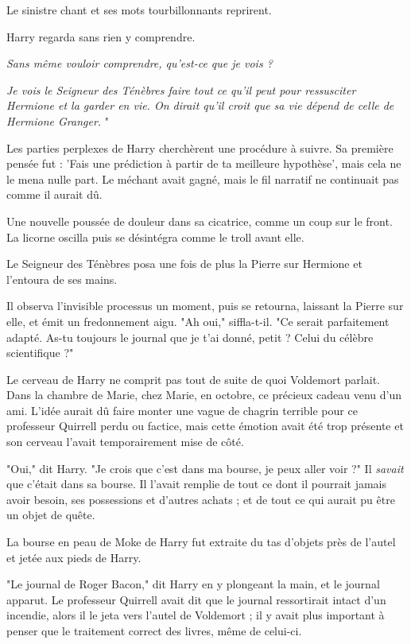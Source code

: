 Le sinistre chant et ses mots tourbillonnants reprirent.

Harry regarda sans rien y comprendre.

\emph{Sans même vouloir comprendre, qu'est-ce que je vois ?} 

\emph{Je vois le Seigneur des Ténèbres faire tout ce qu'il peut pour ressusciter Hermione et la garder en vie. On dirait qu'il croit que sa vie dépend de celle de Hermione Granger.} "

Les parties perplexes de Harry cherchèrent une procédure à suivre. Sa première pensée fut : 'Fais une prédiction à partir de ta meilleure hypothèse', mais cela ne le mena nulle part. Le méchant avait gagné, mais le fil narratif ne continuait pas comme il aurait dû.

Une nouvelle poussée de douleur dans sa cicatrice, comme un coup sur le front. La licorne oscilla puis se désintégra comme le troll avant elle.

Le Seigneur des Ténèbres posa une fois de plus la Pierre sur Hermione et l'entoura de ses mains.

Il observa l'invisible processus un moment, puis se retourna, laissant la Pierre sur elle, et émit un fredonnement aigu. "Ah oui," siffla-t-il. "Ce serait parfaitement adapté. As-tu toujours le journal que je t'ai donné, petit ? Celui du célèbre scientifique ?"

Le cerveau de Harry ne comprit pas tout de suite de quoi Voldemort parlait. Dans la chambre de Marie, chez Marie, en octobre, ce précieux cadeau venu d'un ami. L'idée aurait dû faire monter une vague de chagrin terrible pour ce professeur Quirrell perdu ou factice, mais cette émotion avait été trop présente et son cerveau l'avait temporairement mise de côté.

"Oui," dit Harry. "Je crois que c'est dans ma bourse, je peux aller voir ?" Il \emph{savait}  que c'était dans sa bourse. Il l'avait remplie de tout ce dont il pourrait jamais avoir besoin, ses possessions et d'autres achats ; et de tout ce qui aurait pu être un objet de quête.

La bourse en peau de Moke de Harry fut extraite du tas d'objets près de l'autel et jetée aux pieds de Harry.

"Le journal de Roger Bacon," dit Harry en y plongeant la main, et le journal apparut. Le professeur Quirrell avait dit que le journal ressortirait intact d'un incendie, alors il le jeta vers l'autel de Voldemort ; il y avait plus important à penser que le traitement correct des livres, même de celui-ci.

